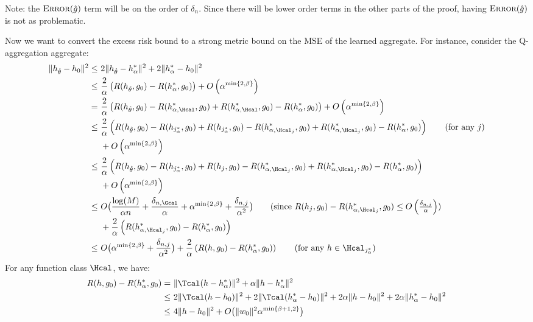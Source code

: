 \documentclass[12pt]{extarticle} %
\newcommand{\error}{\ensuremath{\textsc{Error}}}
\begin{document}
Note: the $\error(\hat{g})$ term will be on the order of $\delta_n$. Since there will be lower order terms in the other parts of the proof, having $\error(\hat{g})$ is not as problematic.

Now we want to convert the excess risk bound to a strong metric bound on the MSE of the learned aggregate. For instance, consider the Q-aggregation aggregate:
\begin{align*}
    \|h_{\hat{\theta}} - h_0\|^2 \leq ~& 2\|h_{\hat{\theta}} - h_{\alpha}^*\|^2 + 2\|h_{\alpha}^*-h_0\|^2\\
    \leq~& \frac{2}{\alpha}\left(R(h_{\hat{\theta}},g_0) - R(h_{\alpha}^*,g_0)\right) + O\left(\alpha^{\min\{2,\beta\}}\right)\\
    =~& \frac{2}{\alpha}\left(R(h_{\hat{\theta}},g_0) -R(h_{\alpha,\Hcal}^*,g_0) + R(h_{\alpha, \Hcal}^*,g_0)-R(h_{\alpha}^*,g_0)\right) + O\left(\alpha^{\min\{2,\beta\}}\right)\\
    \leq~& \frac{2}{\alpha} \left(R(h_{\hat{\theta}},g_0) - R(h_{j_{\alpha}^*},g_0) + R(h_{j_{\alpha}^*},g_0) -R(h_{\alpha,\Hcal_{j}}^*,g_0) + R(h_{\alpha, \Hcal_{j}}^*,g_0)-R(h_{\alpha}^*,g_0)\right) \tag{for any $j$}\\
    ~&+O\left(\alpha^{\min\{2,\beta\}}\right)\\
    \leq ~&\frac{2}{\alpha} \left(R(h_{\hat{\theta}},g_0) - R(h_{j_{\alpha}^*},g_0) + R(h_{j},g_0) -R(h_{\alpha,\Hcal_{j}}^*,g_0) + R(h_{\alpha, \Hcal_{j}}^*,g_0)-R(h_{\alpha}^*,g_0)\right)\\
    ~&+O\left(\alpha^{\min\{2,\beta\}}\right)\\
    \leq ~& O\big(\frac{\log(M)}{\alpha n} + \frac{\delta_{n,\Gcal}}{\alpha} + \alpha^{\min\{2,\beta\}} + \frac{\delta_{n,j}}{\alpha^2}\big) \tag{since $R(h_{j},g_0) -R(h_{\alpha,\Hcal_{j}}^*,g_0) \leq O\left(\frac{\delta_{n,j}}{\alpha}\right)$}\\
    ~&+\frac{2}{\alpha}\left(R(h_{\alpha, \Hcal_{j}}^*,g_0)-R(h_{\alpha}^*,g_0)\right)\\
    \leq ~& O\big(\alpha^{\min\{2,\beta\}} + \frac{\delta_{n,j}}{\alpha^2}\big) + \frac{2}{\alpha}\left(R(h,g_0)-R(h_{\alpha}^*,g_0)\right) \tag{for any $h\in \Hcal_{j_{\alpha}^*}$}\\ 
\end{align*}
For any function class $\Hcal$, we have:
\begin{align*}
    R(h,g_0)-R(h_{\alpha}^*,g_0) = ~& \|\Tcal(h-h_{\alpha}^*)\|^2 + \alpha \|h-h_{\alpha}^*\|^2\\
    \leq ~& 2\|\Tcal(h-h_0)\|^2 + 2\|\Tcal(h_{\alpha}^*-h_0)\|^2 + 2\alpha\|h-h_0\|^2 + 2\alpha \|h_{\alpha}^* - h_0\|^2\\
    \leq~& 4\|h-h_0\|^2 + O\big(\|w_0\|^2\alpha^{\min\{\beta+1,2\}}\big)\\
\end{align*}
\end{document}
